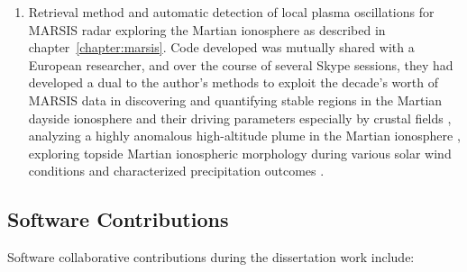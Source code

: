 \begin{enumerate}
\item Retrieval method and automatic detection of local plasma oscillations for MARSIS radar exploring the Martian ionosphere as described in chapter~\ref{chapter:marsis}. Code developed was mutually shared with a European researcher, and over the course of several Skype sessions, they had developed a dual to the author's methods \citep{andrews2013} to exploit the decade's worth of MARSIS data in discovering and quantifying stable regions in the Martian dayside ionosphere \citep{andrews2014} and their driving parameters \citep{dieval2015} especially by crustal fields \citep{andrews2015}, analyzing a highly anomalous high-altitude plume in the Martian ionosphere \citep{andrews2016}, exploring topside Martian ionospheric morphology during various solar wind conditions \citep{withers2016} and characterized precipitation outcomes \citep{dubinin2015}.

\end{enumerate}

\subsection{Software Contributions}
Software collaborative contributions during the dissertation work include:

